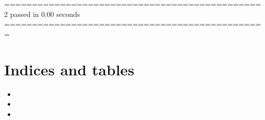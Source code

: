 \documentclass[letterpaper,10pt,brazil]{sphinxmanual}
\begin{document}
============================================== 2 passed in 0.00 seconds ===============================================


\chapter{Indices and tables}
\label{\detokenize{index:indices-and-tables}}\begin{itemize}
\item {} 

\item {} 

\item {} 

\end{itemize}



\renewcommand{\indexname}{Índice}
\printindex
\end{document}
